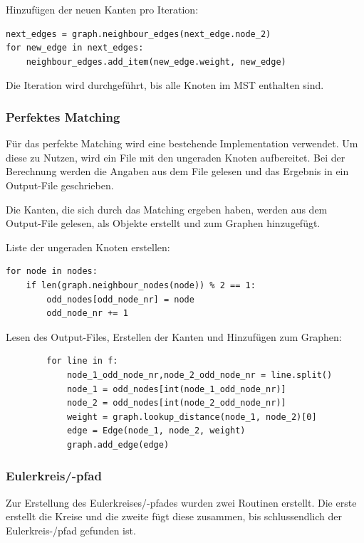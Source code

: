 \documentclass[11pt,a4paper]{article}
\begin{document}
\begin{flushleft}
    Hinzufügen der neuen Kanten pro Iteration:
\end{flushleft}

\begin{verbatim}
next_edges = graph.neighbour_edges(next_edge.node_2)
for new_edge in next_edges:
    neighbour_edges.add_item(new_edge.weight, new_edge)
\end{verbatim}

Die Iteration wird durchgeführt, bis alle Knoten im MST enthalten sind.

\subsubsection{Perfektes Matching}
Für das perfekte Matching wird eine bestehende Implementation verwendet. Um diese zu Nutzen, wird ein File mit den ungeraden Knoten aufbereitet. Bei der Berechnung werden die Angaben aus dem File gelesen und das Ergebnis in ein Output-File geschrieben.

Die Kanten, die sich durch das Matching ergeben haben, werden aus dem Output-File gelesen, als Objekte erstellt und zum Graphen hinzugefügt.

\begin{flushleft}
    Liste der ungeraden Knoten erstellen:
\end{flushleft}
\begin{verbatim}
for node in nodes:
    if len(graph.neighbour_nodes(node)) % 2 == 1:
        odd_nodes[odd_node_nr] = node
        odd_node_nr += 1
\end{verbatim}

\begin{flushleft}
    Lesen des Output-Files, Erstellen der Kanten und Hinzufügen zum Graphen:
\end{flushleft}
\begin{verbatim}
        for line in f:
            node_1_odd_node_nr,node_2_odd_node_nr = line.split()
            node_1 = odd_nodes[int(node_1_odd_node_nr)] 
            node_2 = odd_nodes[int(node_2_odd_node_nr)]
            weight = graph.lookup_distance(node_1, node_2)[0]
            edge = Edge(node_1, node_2, weight)
            graph.add_edge(edge)
\end{verbatim}

\subsubsection{Eulerkreis/-pfad}
Zur Erstellung des Eulerkreises/-pfades wurden zwei Routinen erstellt. Die erste erstellt die Kreise und die zweite fügt diese zusammen, bis schlussendlich der Eulerkreis-/pfad gefunden ist.
\end{document}
